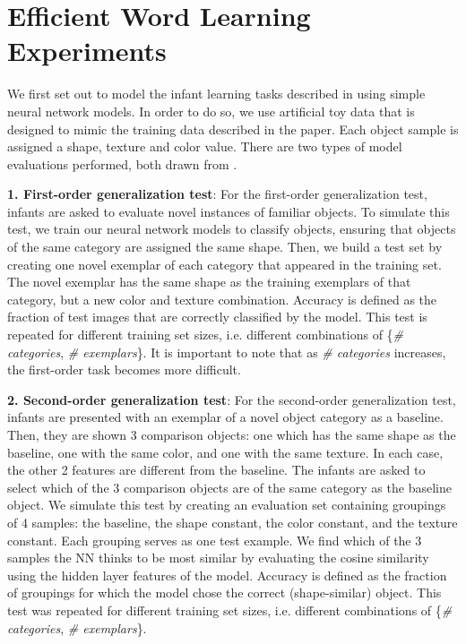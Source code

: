 \section{Efficient Word Learning Experiments}
We first set out to model the infant learning tasks described in \cite{Smith2002} using
simple neural network models. In order to do so, we use artificial toy data that is designed
to mimic the training data described in the paper. Each object sample is assigned a shape,
texture and color value. There are two types of model evaluations performed, both drawn from
\cite{Smith2002}.

{\bf1. First-order generalization test}: For the first-order generalization test, infants
are asked to evaluate novel instances of familiar objects. To simulate this test, we train
our neural network models to classify objects, ensuring that objects of the same category
are assigned the same shape. Then, we build a test set by creating one novel exemplar of
each category that appeared in the training set. The novel exemplar has the same
shape as the training exemplars of that category, but a new color and texture combination.
Accuracy is defined as the fraction of test images that are correctly classified by the model.
This test is repeated for different training set sizes, i.e. different combinations of
\{\textit{\# categories}, \textit{\# exemplars}\}. It is important to note that as
\textit{\# categories} increases, the first-order task becomes more difficult.

{\bf2. Second-order generalization test}: For the second-order generalization test, infants
are presented with an exemplar of a novel object category as a baseline. Then, they are
shown 3 comparison objects: one which has the same shape as the baseline, one with the same
color, and one with the same texture. In each case, the other 2 features are different from
the baseline. The infants are asked to select which of the 3 comparison objects are of the
same category as the baseline object. We simulate this test by creating an evaluation set
containing groupings of 4 samples: the baseline, the shape constant, the color constant, and
the texture constant. Each grouping serves as one test example. We find which of the 3
samples the NN thinks to be most similar by evaluating the cosine similarity using the
hidden layer features of the model. Accuracy is defined as the fraction of groupings for
which the model chose the correct (shape-similar) object. This test was repeated for
different training set sizes, i.e. different combinations of \{\textit{\# categories},
\textit{\# exemplars}\}.

